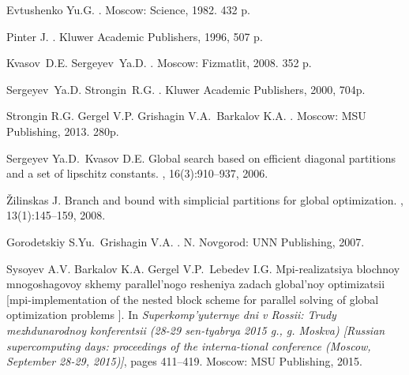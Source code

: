 \documentclass[a4paper]{article}
\begin{document}
\begin{thebibliography}{10}

Evtushenko Yu.G.
.
\newblock Moscow: Science, 1982. 432 p.

Pinter J.
.
\newblock Kluwer Academic Publishers, 1996, 507 p.

Kvasov~D.E. Sergeyev~Ya.D.
.
\newblock Moscow: Fizmatlit, 2008. 352 p.

Sergeyev~Ya.D. Strongin~R.G.
.
\newblock Kluwer Academic Publishers, 2000, 704p.

Strongin R.G. Gergel V.P. Grishagin V.A.~Barkalov K.A.
.
\newblock Moscow: MSU Publishing, 2013. 280p.

Sergeyev Ya.D.~Kvasov D.E.
\newblock Global search based on efficient diagonal partitions and a set of
  lipschitz constants.
, 16(3):910–937, 2006.

Žilinskas J.
\newblock Branch and bound with simplicial partitions for global optimization.
, 13(1):145–159, 2008.

Gorodetskiy S.Yu.~Grishagin V.A.
.
\newblock N. Novgorod: UNN Publishing, 2007.

Sysoyev A.V. Barkalov K.A. Gergel V.P.~Lebedev I.G.
\newblock Mpi-realizatsiya blochnoy mnogoshagovoy skhemy parallel'nogo
  resheniya zadach global'noy optimizatsii [mpi-implementation of the nested
  block scheme for parallel solving of global optimization problems ].
\newblock In {\em Superkomp'yuternye dni v Rossii: Trudy mezhdunarodnoy
  konferentsii (28-29 sen-tyabrya 2015 g., g. Moskva) [Russian supercomputing
  days: proceedings of the interna-tional conference (Moscow, September 28-29,
  2015)]}, pages 411--419. Moscow: MSU Publishing, 2015.


\end{thebibliography}
\end{document}
